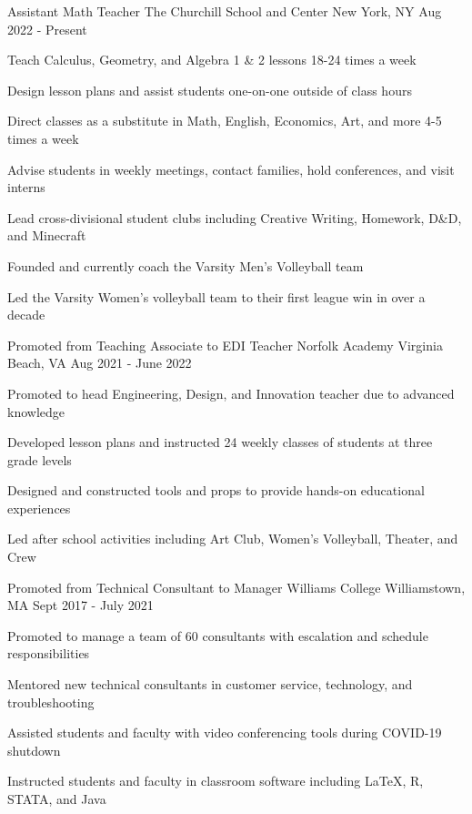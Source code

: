 \begin{cventries}
  \cventry
  {Assistant Math Teacher}
  {The Churchill School and Center}
  {New York, NY}
  {Aug 2022 - Present}
  {
    \begin{cvitems}
      \item {Teach Calculus, Geometry, and Algebra 1 \& 2 lessons 18-24 times a week}
      \item {Design lesson plans and assist students one-on-one outside of class hours}
      \item {Direct classes as a substitute in Math, English, Economics, Art, and more 4-5 times a week}
      \item {Advise students in weekly meetings, contact families, hold conferences, and visit interns}
      \item {Lead cross-divisional student clubs including Creative Writing, Homework, D\&D, and Minecraft}
      \item {Founded and currently coach the Varsity Men's Volleyball team}
      \item {Led the Varsity Women's volleyball team to their first league win in over a decade}
    \end{cvitems}
  }

  \cventry
  {Promoted from Teaching Associate to EDI Teacher}
  {Norfolk Academy}
  {Virginia Beach, VA}
  {Aug 2021 - June 2022}
  {
    \begin{cvitems}
      \item {Promoted to head Engineering, Design, and Innovation teacher due to advanced knowledge}
      \item {Developed lesson plans and instructed 24 weekly classes of students at three grade levels}
      \item {Designed and constructed tools and props to provide hands-on educational experiences}
      \item {Led after school activities including Art Club, Women's Volleyball, Theater, and Crew}
    \end{cvitems}
  }

  \cventry
  {Promoted from Technical Consultant to Manager}
  {Williams College}
  {Williamstown, MA}
  {Sept 2017 - July 2021}
  {
    \begin{cvitems}
      \item {Promoted to manage a team of 60 consultants with escalation and schedule responsibilities}
      \item {Mentored new technical consultants in customer service, technology, and troubleshooting}
      \item {Assisted students and faculty with video conferencing tools during COVID-19 shutdown}
      \item {Instructed students and faculty in classroom software including LaTeX, R, STATA, and Java}
    \end{cvitems}
  }


\end{cventries}
